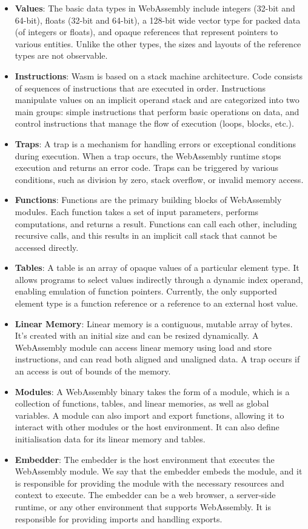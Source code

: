 \documentclass{article}
\begin{document}
\begin{itemize}
    \item \textbf{Values}: The basic data types in WebAssembly include integers (32-bit and 64-bit), floats (32-bit and 64-bit), a 128-bit wide vector type for packed data (of integers or floats), and opaque references that represent pointers to various entities. Unlike the other types, the sizes and layouts of the reference types are not observable.
    \item \textbf{Instructions}:  Wasm is based on a stack machine architecture. Code consists of sequences of instructions that are executed in order. Instructions manipulate values on an implicit operand stack and are categorized into two main groups: simple instructions that perform basic operations on data, and control instructions that manage the flow of execution (loops, blocks, etc.).
    \item \textbf{Traps}: A trap is a mechanism for handling errors or exceptional conditions during execution. When a trap occurs, the WebAssembly runtime stops execution and returns an error code. Traps can be triggered by various conditions, such as division by zero, stack overflow, or invalid memory access.
    \item \textbf{Functions}: Functions are the primary building blocks of WebAssembly modules. Each function takes a set of input parameters, performs computations, and returns a result. Functions can call each other, including recursive calls, and this results in an implicit call stack that cannot be accessed directly.
    \item \textbf{Tables}: A table is an array of opaque values of a particular element type. It allows programs to select values indirectly through a dynamic index operand, enabling emulation of function pointers. Currently, the only supported element type is a function reference or a reference to an external host value.
    \item \textbf{Linear Memory}: Linear memory is a contiguous, mutable array of bytes. It's created with an initial size and can be resized dynamically. A WebAssembly module can access linear memory using load and store instructions, and can read both aligned and unaligned data. A trap occurs if an access is out of bounds of the memory.
    \item \textbf{Modules}: A WebAssembly binary takes the form of a module, which is a collection of functions, tables, and linear memories, as well as global variables. A module can also import and export functions, allowing it to interact with other modules or the host environment. It can also define initialisation data for its linear memory and tables.
    \item \textbf{Embedder}: The embedder is the host environment that executes the WebAssembly module. We say that the embedder embeds the module, and it is responsible for providing the module with the necessary resources and context to execute. The embedder can be a web browser, a server-side runtime, or any other environment that supports WebAssembly. It is responsible for providing imports and handling exports.
\end{itemize}
\end{document}
